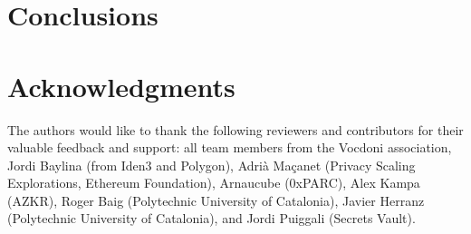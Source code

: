 \documentclass[runningheads, draft]{llncs}
\begin{document}
\section{Conclusions}
\label{sec:conclusions}


\section*{Acknowledgments}
\label{sec:acknowledgments}

The authors would like to thank the following reviewers and contributors for their valuable feedback and support: all team members from the Vocdoni association, Jordi Baylina (from Iden3 and Polygon), Adrià Maçanet (Privacy Scaling Explorations, Ethereum Foundation), Arnaucube (0xPARC), Alex Kampa (AZKR), Roger Baig (Polytechnic University of Catalonia), Javier Herranz (Polytechnic University of Catalonia), and Jordi Puiggali (Secrets Vault).





\end{document}
